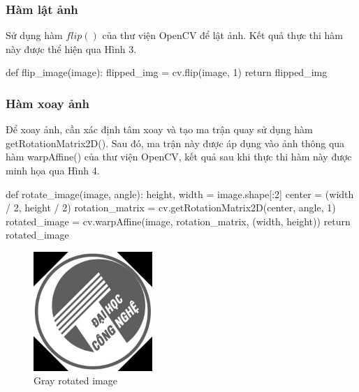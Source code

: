 \documentclass[a4paper]{article}
\begin{document}
\subsubsection{Hàm lật ảnh}
Sử dụng hàm $flip()$ của thư viện OpenCV để lật ảnh. Kết quả thực thi hàm này được thể hiện qua Hình 3.
\begin{python}
def flip_image(image):
    flipped_img = cv.flip(image, 1)
    return flipped_img
\end{python}
\subsubsection{Hàm xoay ảnh}
Để xoay ảnh, cần xác định tâm xoay và tạo ma trận quay sử dụng hàm getRotationMatrix2D(). Sau đó, ma trận này được áp dụng vào ảnh thông qua hàm warpAffine() của thư viện OpenCV, kết quả sau khi thực thi hàm này được minh họa qua Hình 4.
\begin{python}
def rotate_image(image, angle):
    height, width = image.shape[:2]
    center = (width / 2, height / 2)
    rotation_matrix = cv.getRotationMatrix2D(center, angle, 1)
    rotated_image = cv.warpAffine(image, rotation_matrix, (width, height))
    return rotated_image
\end{python}
\begin{figure}[ht]
  \centering
  \includegraphics[width=0.4\textwidth]{images/gray_rotated.jpg}
  \caption{Gray rotated image}
\end{figure}
\end{document}
